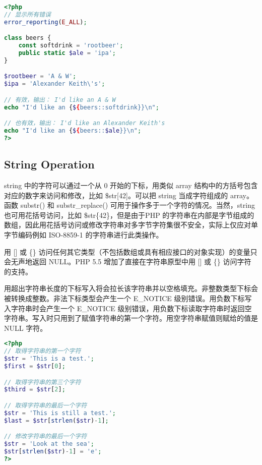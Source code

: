 \begin{compactitem}
\begin{lstlisting}[language=PHP]
<?php
// 显示所有错误
error_reporting(E_ALL);

class beers {
    const softdrink = 'rootbeer';
    public static $ale = 'ipa';
}

$rootbeer = 'A & W';
$ipa = 'Alexander Keith\'s';

// 有效，输出： I'd like an A & W
echo "I'd like an {${beers::softdrink}}\n";

// 也有效，输出： I'd like an Alexander Keith's
echo "I'd like an {${beers::$ale}}\n";
?>
\end{lstlisting}

\end{compactitem}


\subsection{String Operation}


string 中的字符可以通过一个从 0 开始的下标，用类似 array 结构中的方括号包含对应的数字来访问和修改，比如 \$str[42]。可以把 string 当成字符组成的 array。函数 substr() 和 substr\_replace() 可用于操作多于一个字符的情况。当然，string 也可用花括号访问，比如 \$str\{42\}，但是由于PHP 的字符串在内部是字节组成的数组，因此用花括号访问或修改字符串对多字节字符集很不安全，实际上仅应对单字节编码例如 ISO-8859-1 的字符串进行此类操作。

用 [\/] 或 \{\} 访问任何其它类型（不包括数组或具有相应接口的对象实现）的变量只会无声地返回 NULL。PHP 5.5 增加了直接在字符串原型中用 [\/] 或 \{\} 访问字符的支持。

用超出字符串长度的下标写入将会拉长该字符串并以空格填充。非整数类型下标会被转换成整数。非法下标类型会产生一个 E\_NOTICE 级别错误。用负数下标写入字符串时会产生一个 E\_NOTICE 级别错误，用负数下标读取字符串时返回空字符串。写入时只用到了赋值字符串的第一个字符。用空字符串赋值则赋给的值是 NULL 字符。

\begin{lstlisting}[language=PHP]
<?php
// 取得字符串的第一个字符
$str = 'This is a test.';
$first = $str[0];

// 取得字符串的第三个字符
$third = $str[2];

// 取得字符串的最后一个字符
$str = 'This is still a test.';
$last = $str[strlen($str)-1]; 

// 修改字符串的最后一个字符
$str = 'Look at the sea';
$str[strlen($str)-1] = 'e';
?>
\end{lstlisting}

